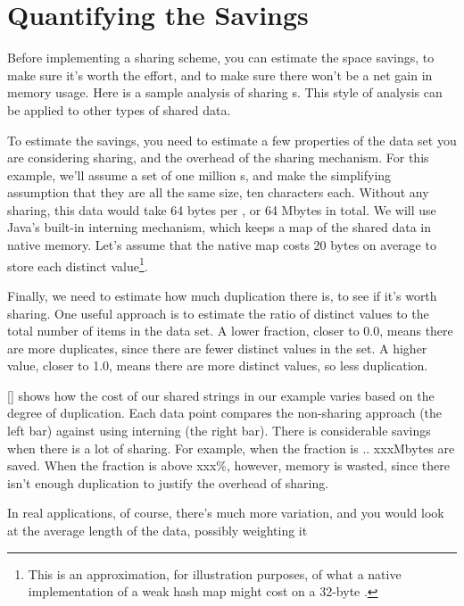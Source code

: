 

\section{Quantifying the Savings}
\label{sec:quantifying-sharing-savings}

Before implementing a sharing scheme, you can estimate the
space savings, to make sure it's worth the effort, and to 
make sure there won't be a net gain in memory usage. Here is a sample analysis
of sharing s.
This style of analysis can be applied to other types of shared data.

To estimate the savings, you need to estimate
a few properties of the data set you are considering sharing, and the
overhead of the sharing mechanism. For this example,
we'll assume a set of one million s, and make the simplifying
assumption that they are all the same size, ten characters each.
Without any sharing, this data would take 64 bytes per , or 64
Mbytes in total.
We will use Java's built-in interning
mechanism, which keeps a map of the shared data in native memory. Let's assume
that the native map costs 20 bytes on average to store each distinct
value\footnote{This is an approximation, for illustration purposes, of what a
native implementation of a weak hash map might cost on a 32-byte \jre.}. 

Finally, we need to estimate how much duplication there is, to
see if it's worth sharing. One useful approach is to estimate the
ratio of distinct values to the total number of items in the data set. A lower
fraction, closer to 0.0, means there are more duplicates, since
there are fewer distinct values in the set. A higher value, closer to 1.0, means
there are more distinct values, so less duplication. 

\autoref{} shows how the cost of our shared strings
in our example varies based on the degree of duplication. Each data point
compares the non-sharing approach (the left bar) against using interning (the
right bar). There is considerable savings when there is a lot of sharing.
For example, when the fraction is .. xxxMbytes are saved.  When the fraction is
above xxx\%, however, memory is wasted, since there isn't enough duplication to
justify the overhead of sharing.


In real applications, of course, there's much more variation, and you would look
at the average length of the data, possibly weighting it 


